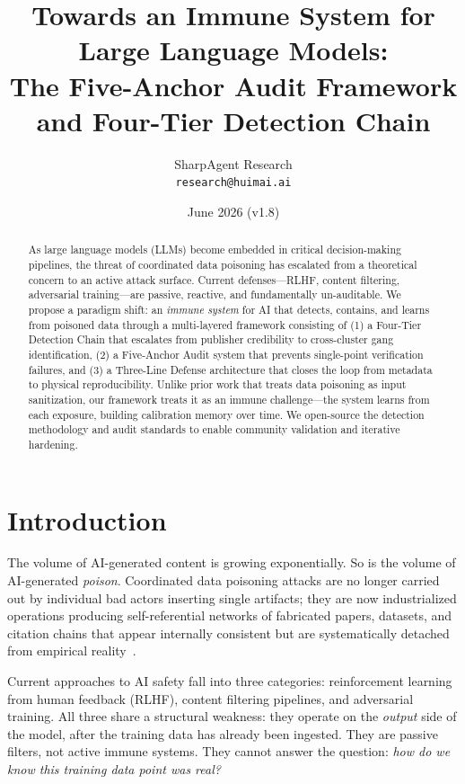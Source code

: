 \documentclass[11pt]{article}
\title{Towards an Immune System for Large Language Models: \\
The Five-Anchor Audit Framework and Four-Tier Detection Chain}
\author{SharpAgent Research \\
\texttt{research@huimai.ai}}
\date{June 2026 (v1.8)}
\begin{document}
\maketitle

\begin{abstract}
As large language models (LLMs) become embedded in critical decision-making pipelines, 
the threat of coordinated data poisoning has escalated from a theoretical concern to an 
active attack surface. Current defenses---RLHF, content filtering, adversarial training---are 
passive, reactive, and fundamentally un-auditable. We propose a paradigm shift: an 
\textit{immune system} for AI that detects, contains, and learns from poisoned data through 
a multi-layered framework consisting of (1) a Four-Tier Detection Chain that escalates 
from publisher credibility to cross-cluster gang identification, (2) a Five-Anchor Audit 
system that prevents single-point verification failures, and (3) a Three-Line Defense 
architecture that closes the loop from metadata to physical reproducibility. Unlike prior 
work that treats data poisoning as input sanitization, our framework treats it as an 
immune challenge---the system learns from each exposure, building calibration memory 
over time. We open-source the detection methodology and audit standards to enable 
community validation and iterative hardening.
\end{abstract}

\section{Introduction}

The volume of AI-generated content is growing exponentially. So is the volume of 
AI-generated \textit{poison}. Coordinated data poisoning attacks are no longer carried 
out by individual bad actors inserting single artifacts; they are now industrialized 
operations producing self-referential networks of fabricated papers, datasets, and 
citation chains that appear internally consistent but are systematically detached 
from empirical reality~\cite{anthropic_cai_2023}.

Current approaches to AI safety fall into three categories: reinforcement learning 
from human feedback (RLHF), content filtering pipelines, and adversarial training. 
All three share a structural weakness: they operate on the \textit{output} side of the 
model, after the training data has already been ingested. They are passive filters, 
not active immune systems. They cannot answer the question: \textit{how do we know this 
training data point was real?}
\end{document}
